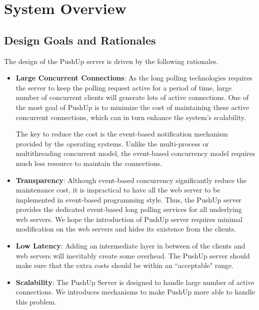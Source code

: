\section {System Overview\\}

\subsection{Design Goals and Rationales\\}
The design of the PushUp server is driven by the following rationales.
\begin{itemize}
\item {\bf Large Concurrent Connections}:
    As the long polling technologies requires the server to keep the polling
    request active for a period of time, large number of concurrent clients 
    will generate lots of active connections. One of the most goal of PushUp
    is to minimize the cost of maintaining these active concurrent connections,
    which can in turn enhance the system's scalability.
     
    The key to reduce the cost is the event-based notification mechanism 
    provided by the operating systems. Unlike the multi-process or 
    multithreading concurrent model, the event-based concurrency model 
    requires much less resource to maintain the connections.

\item {\bf Transparency}: Although event-based concurrency significantly 
    reduce the maintenance cost, it is impractical to have all the web 
    server to be implemented in event-based programming style. Thus, the 
    PushUp server provides the dedicated event-based long polling services
    for all underlying web servers. We hope the introduction of PushUp server
    requires minimal modification on the web servers and hides its existence
    from the clients.

\item {\bf Low Latency}: Adding an intermediate layer in between of the 
    clients and web servers will inevitably create some overhead. 
    The PushUp server should make sure that the extra costs should be within
    an ``acceptable" range.

\item {\bf Scalability}: The PushUp Server is designed to handle large number of
    active connections. We introduces mechanisms to make PushUp more able to
    handle this problem. 

\end{itemize}

